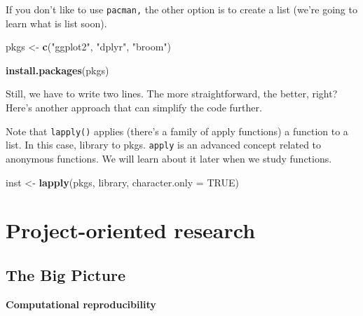 \documentclass[
]{book}
\newenvironment{Shaded}{\begin{snugshade}}{\end{snugshade}}
\newcommand{\DataTypeTok}[1]{\textcolor[rgb]{0.13,0.29,0.53}{#1}}
\newcommand{\KeywordTok}[1]{\textcolor[rgb]{0.13,0.29,0.53}{\textbf{#1}}}
\newcommand{\NormalTok}[1]{#1}
\newcommand{\OtherTok}[1]{\textcolor[rgb]{0.56,0.35,0.01}{#1}}
\newcommand{\StringTok}[1]{\textcolor[rgb]{0.31,0.60,0.02}{#1}}
\begin{document}
If you don't like to use \texttt{pacman,} the other option is to create a list (we're going to learn what is list soon).

\begin{Shaded}
\begin{Highlighting}[]
\NormalTok{pkgs \textless{}{-}}\StringTok{ }\KeywordTok{c}\NormalTok{(}\StringTok{"ggplot2"}\NormalTok{, }\StringTok{"dplyr"}\NormalTok{, }\StringTok{"broom"}\NormalTok{)}

\KeywordTok{install.packages}\NormalTok{(pkgs)}
\end{Highlighting}
\end{Shaded}

Still, we have to write two lines. The more straightforward, the better, right? Here's another approach that can simplify the code further.

Note that \texttt{lapply()} applies (there's a family of apply functions) a function to a list. In this case, library to pkgs. \texttt{apply} is an advanced concept related to anonymous functions. We will learn about it later when we study functions.

\begin{Shaded}
\begin{Highlighting}[]
\NormalTok{inst \textless{}{-}}\StringTok{ }\KeywordTok{lapply}\NormalTok{(pkgs, library, }
               \DataTypeTok{character.only =} \OtherTok{TRUE}\NormalTok{)}
\end{Highlighting}
\end{Shaded}

\hypertarget{project-oriented-research}{%
\section{Project-oriented research}\label{project-oriented-research}}

\hypertarget{the-big-picture-3}{%
\subsection{The Big Picture}\label{the-big-picture-3}}

\textbf{Computational reproducibility}
\end{document}
